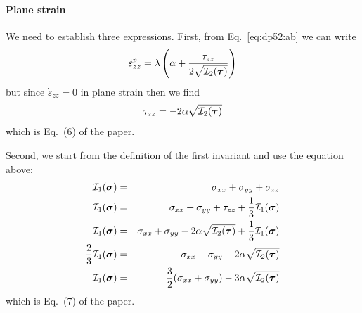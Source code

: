 \paragraph{Plane strain} 
We need to establish three expressions.  
First, from Eq.~\eqref{eq:dp52:ab} we can write 
\[
\dot\varepsilon_{zz}^{p} = \lambda \left( \alpha  + \frac{\tau_{zz}}{2\sqrt{{\cal I}_2(\bm\tau)}} \right)
\]
but since $\dot\varepsilon_{zz}=0$ in plane strain then we find
\begin{equation}
\tau_{zz} = - 2 \alpha \sqrt{{\cal I}_2(\bm\tau)}
\end{equation}
which is Eq.~(6) of the paper. 

Second, we start from the definition of the first invariant and use the equation above:
\begin{eqnarray}
{\cal I}_1(\bm \sigma)&=& \sigma_{xx}+\sigma_{yy}+\sigma_{zz} \nonumber\\
{\cal I}_1(\bm \sigma)&=& \sigma_{xx}+\sigma_{yy}+\tau_{zz}+\frac13 {\cal I}_1(\bm \sigma) \nonumber\\
{\cal I}_1(\bm \sigma)&=& \sigma_{xx}+\sigma_{yy}- 2 \alpha \sqrt{{\cal I}_2(\bm\tau)} 
+\frac13 {\cal I}_1(\bm \sigma)\nonumber\\
\frac23 {\cal I}_1(\bm \sigma)&=& \sigma_{xx}+\sigma_{yy}- 2 \alpha \sqrt{{\cal I}_2(\bm\tau)} \nonumber\\
{\cal I}_1(\bm \sigma)&=& \frac32(\sigma_{xx}+\sigma_{yy})- 3 \alpha \sqrt{{\cal I}_2(\bm\tau)} 
\label{eq:I1dpps}
\end{eqnarray}
which is Eq.~(7) of the paper.

